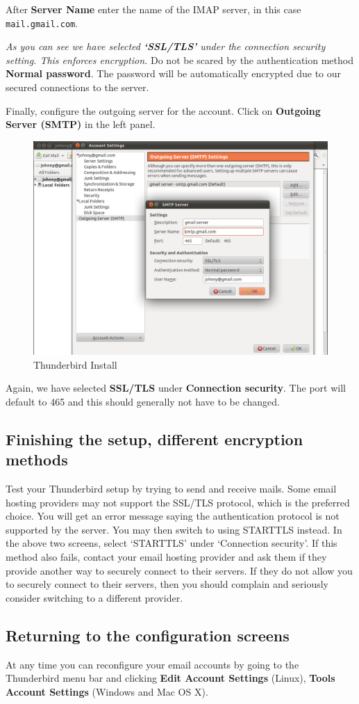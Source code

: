 After \textbf{Server Name} enter the name of the IMAP server, in this
case \verb!mail.gmail.com!.

\emph{As you can see we have selected \textbf{`SSL/TLS'} under the
connection security setting. This enforces encryption.} Do not be scared
by the authentication method \textbf{Normal password}. The password will
be automatically encrypted due to our secured connections to the server.

Finally, configure the outgoing server for the account. Click on
\textbf{Outgoing Server (SMTP)} in the left panel.

\begin{figure}[htbp]
\centering
\includegraphics{thunderbird_conf_5.png}
\caption{Thunderbird Install}
\end{figure}

Again, we have selected \textbf{SSL/TLS} under \textbf{Connection
security}. The port will default to 465 and this should generally not
have to be changed.

\subsection{Finishing the setup, different encryption methods}

Test your Thunderbird setup by trying to send and receive mails. Some
email hosting providers may not support the SSL/TLS protocol, which is
the preferred choice. You will get an error message saying the
authentication protocol is not supported by the server. You may then
switch to using STARTTLS instead. In the above two screens, select
`STARTTLS' under `Connection security'. If this method also fails,
contact your email hosting provider and ask them if they provide another
way to securely connect to their servers. If they do not allow you to
securely connect to their servers, then you should complain and
seriously consider switching to a different provider.

\subsection{Returning to the configuration screens}

At any time you can reconfigure your email accounts by going to the
Thunderbird menu bar and clicking \textbf{Edit \textbar{} Account
Settings} (Linux), \textbf{Tools \textbar{} Account Settings} (Windows
and Mac OS X).
